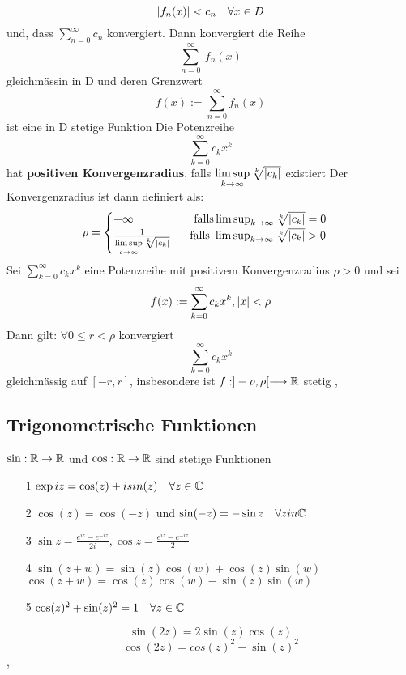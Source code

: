 \[\left\lvert f_n(x) \right\rvert < c_n \quad \forall x \in D \]
und, dass \(\sum_{n=0}^\infty c_n\) konvergiert. Dann konvergiert die Reihe
\[\sum_{n=0}^\infty\ f_n(x)\]
gleichmässin in D und deren Grenzwert
\[f(x) := \sum_{n=0}^{\infty} f_n(x)\]
ist eine in D stetige Funktion \newline
\Def[3.39] Die Potenzreihe
\[\sum_{k=0}^\infty c_kx^k\]
hat \textbf{positiven Konvergenzradius}, falls \(\limsup\limits_{k \rightarrow \infty} \sqrt[k]{\left\lvert c_k \right\rvert}\) existiert
Der Konvergenzradius ist dann definiert als:
\[\rho = \begin{cases}
    +\infty \quad \quad \quad \quad \quad \  \text{falls} \limsup_{k \rightarrow \infty} \sqrt[k]{\left\lvert c_k \right\rvert} = 0 \\
    \frac{1}{\limsup\limits_{c \rightarrow \infty} \sqrt[k]{\left|c_{k}\right|}}  \quad \  \ \text{falls } \limsup_{k \rightarrow \infty} \sqrt[k]{\left\lvert c_k \right\rvert} > 0
    \end{cases}\]
\newline
\Satz[3.40] Sei \(\sum_{k=0}^\infty c_kx^k \) eine Potenzreihe mit positivem Konvergenzradius \(\rho > 0\) und sei 
\[f(x) := \sum_{k=0}^\infty c_kx^k, \left\lvert x \right\rvert < \rho \]
Dann gilt: \(\forall 0 \leq r < \rho \) konvergiert
\[\sum_{k=0}^\infty c_kx^k \]
gleichmässig auf \([-r,r]\), insbesondere ist \newline \(f: ] -\rho,\rho [ \longrightarrow \mathbb{R}\) stetig \newline
\sep
\subsection{Trigonometrische Funktionen}
\Satz[3.41] \( \sin: \mathbb{R} \rightarrow \mathbb{R} \) und \(\cos: \mathbb{R} \rightarrow \mathbb{R} \) sind stetige Funktionen
\begin{enumerate}
    \item [1] \( \exp iz = \cos(z) + i sin(z) \quad \forall z \in \mathbb{C} \)
    \item [2] \( \cos(z) = \cos(-z)\) und \(\sin(-z) = -\sin z \quad \forall z in \mathbb{C} \)
    \item [3] \( \sin z = \frac{e^{iz} - e^{-iz}}{2i}, \cos z = \frac{e^{iz} - e^{-iz}}{2}\)
    \item [4] \( \sin(z + w) = \sin(z) \cos(w) + \cos(z) \sin(w)\) \newline
    \( \cos(z + w) = \cos(z) \cos(w) - \sin(z) \sin(w) \)
    \item [5] \( \cos(z)^2 + \sin(z)^2 = 1 \quad \forall z \in \mathbb{C} \)
\end{enumerate}
\[\sin(2z) = 2 \sin(z) \cos(z)\]
\[\cos(2z) = cos(z)^2 - \sin(z)^2\]
\sep

